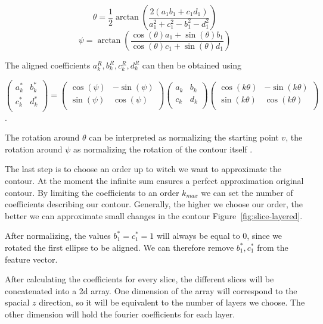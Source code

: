 $$
\theta = \frac{1}{2}\arctan \left( \frac{2(a_1b_1 + c_1d_1)}{a_1^2 + c_1^2 - b_1^2 - d_1^2} \right)
$$
$$
\psi = \arctan \left( \frac{\cos(\theta) a_1 + \sin(\theta) b_1 }{\cos(\theta) c_1 + \sin(\theta) d_1} \right)
$$

The aligned coefficients $a_k^R, b_k^R, c_k^R, d_k^R$ can then be obtained using

$$
\begin{pmatrix}
  a_k^* & b_k^* \\
  c_k^* & d_k^* \\
\end{pmatrix}
=
\begin{pmatrix}
  \cos(\psi) & -\sin(\psi) \\
  \sin(\psi) & \cos(\psi) \\
\end{pmatrix}
\begin{pmatrix}
  a_k & b_k \\
  c_k & d_k \\
\end{pmatrix}
\begin{pmatrix}
  \cos(k\theta ) & -\sin(k\theta) \\
  \sin(k\theta) & \cos(k\theta) \\
\end{pmatrix}
$$.

The rotation around $\theta $ can be interpreted as normalizing the starting point $v$, 
the rotation around $\psi$ as normalizing the rotation of the contour itself \cite{KUHL1982236}.

The last step is to choose an order up to witch we want to approximate the contour.
At the moment the infinite sum ensures a perfect approximation original contour. 
By limiting the coefficients to an order $k_{max}$ we can set the number of coefficients describing our contour.
Generally, the higher we choose our order, the better we can approximate small changes in the contour Figure~\ref{fig:slice-layered}.

After normalizing, the values $b_1^* = c_1^* = 1$ will always be equal to 0, since we rotated the first ellipse to be aligned.
We can therefore remove $b_1^*, c_1^*$ from the feature vector.

After calculating the coefficients for every slice, the different slices will be concatenated into a 2d array.
One dimension of the array will correspond to the spacial $z$ direction, so it will be equivalent to the number of layers we choose.
The other dimension will hold the fourier coefficients for each layer.

